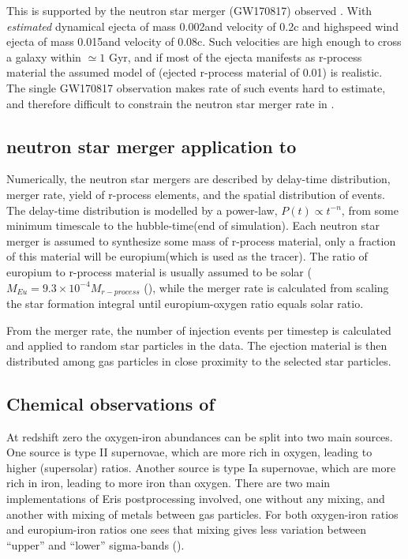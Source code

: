 This is supported by the neutron star merger (GW170817) observed .
With \textit{estimated} dynamical ejecta of mass 0.002\msol and velocity of 0.2c and highspeed wind ejecta of mass 0.015\msol and velocity of 0.08c. Such velocities are high enough to cross a galaxy within $\simeq 1$ Gyr, and if most of the ejecta manifests as r-process material the assumed model of  (ejected r-process material of 0.01\msol) is realistic. The single GW170817 observation makes rate of such events hard to estimate, and therefore difficult to constrain the neutron star merger rate in \eris.


\subsection{neutron star merger application to \eris}
Numerically, the neutron star mergers are described by delay-time distribution, merger rate, yield of r-process elements, and the spatial distribution of events.
The delay-time distribution is modelled by a power-law, $P(t) \propto t^{-n}$, from some minimum timescale to the hubble-time(end of simulation).
Each neutron star merger is assumed to synthesize some mass of r-process material, only a fraction of this material will be europium(which is used as the tracer).
The ratio of europium to r-process material is usually assumed to be solar ($M_{Eu}=9.3\times10^{-4}M_{r-process}$ (), while the merger rate is calculated from scaling the star formation integral until europium-oxygen ratio equals solar ratio.

From the merger rate, the number of injection events per timestep is calculated and applied to random star particles in the data. The ejection material is then distributed among gas particles in close proximity to the selected star particles.

\subsection{Chemical observations of \eris}
At redshift zero the oxygen-iron abundances can be split into two main sources.
One source is type II supernovae, which are more rich in oxygen,
leading to higher (supersolar) ratios.
Another source is type Ia supernovae, which are more rich in iron, leading to more iron than oxygen.
There are two main implementations of Eris postprocessing involved, one without any mixing, and another with mixing of metals between gas particles. For both oxygen-iron ratios and europium-iron ratios one sees that mixing gives less variation between ``upper'' and ``lower'' sigma-bands ().

